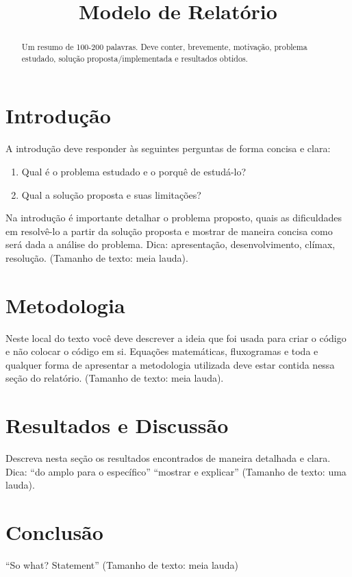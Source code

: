 \documentclass[10pt,conference]{IEEEtran}
\begin{document}
\title{Modelo de Relatório}

\newif\iffinal
\finalfalse
\finaltrue
\newcommand{\jemsid}{99999}

\iffinal
\author{
}
\fi


\maketitle

\begin{abstract}
Um resumo de 100-200 palavras. Deve conter, brevemente, motivação, problema estudado, solução proposta/implementada e resultados obtidos.
\end{abstract}
\IEEEpeerreviewmaketitle

\section{Introdução}

A introdução deve responder às seguintes perguntas de forma concisa e clara:

\begin{enumerate}
\item Qual é o problema estudado e o porquê de estudá-lo?
\item Qual a solução proposta e suas limitações?
\end{enumerate}

Na introdução é importante detalhar o problema proposto, quais as dificuldades em resolvê-lo a partir da solução proposta e mostrar de maneira concisa como será dada a análise do problema. Dica: apresentação, desenvolvimento, clímax, resolução. (Tamanho de texto: meia lauda).

\section{Metodologia}

Neste local do texto você deve descrever a ideia que foi usada para criar o código e não colocar o código em si. Equações matemáticas, fluxogramas e toda e qualquer forma de apresentar a metodologia utilizada deve estar contida nessa seção do relatório. (Tamanho de texto: meia lauda).

\section{Resultados e Discussão}

Descreva nesta seção os resultados encontrados de maneira detalhada e clara. Dica: ``do amplo para o específico'' ``mostrar e explicar'' (Tamanho de texto: uma lauda).

\section{Conclusão}

``So what? Statement'' (Tamanho de texto: meia lauda)
\end{document}
